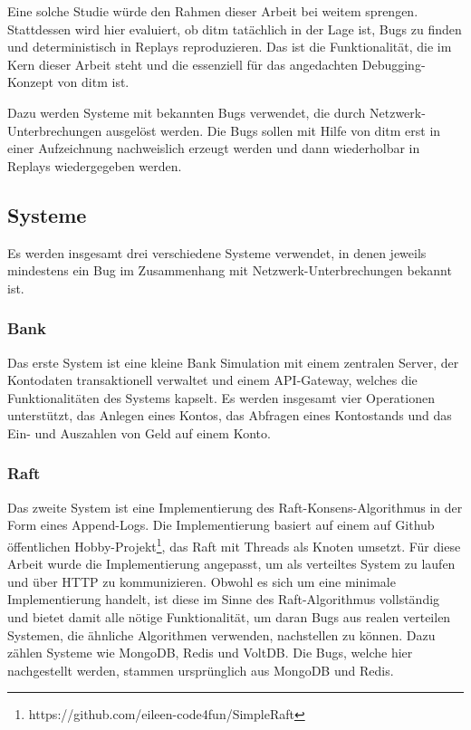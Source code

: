 \documentclass[12pt,a4paper]{report}
\begin{document}
Eine solche Studie würde den Rahmen dieser Arbeit bei weitem sprengen. Stattdessen wird hier evaluiert, ob ditm tatächlich in der
Lage ist, Bugs zu finden und deterministisch in Replays reproduzieren. Das ist die Funktionalität, die im Kern dieser Arbeit steht
und die essenziell für das angedachten Debugging-Konzept von ditm ist.

Dazu werden Systeme mit bekannten Bugs verwendet, die durch Netzwerk-Unterbrechungen ausgelöst werden. Die Bugs sollen mit Hilfe
von ditm erst in einer Aufzeichnung nachweislich erzeugt werden und dann wiederholbar in Replays wiedergegeben werden.

\subsection{Systeme}
Es werden insgesamt drei verschiedene Systeme verwendet, in denen jeweils mindestens ein Bug im Zusammenhang mit
Netzwerk-Unterbrechungen bekannt ist.

\subsubsection{Bank}
Das erste System ist eine kleine Bank Simulation mit einem zentralen Server, der Kontodaten transaktionell verwaltet und einem
API-Gateway, welches die Funktionalitäten des Systems kapselt. Es werden insgesamt vier Operationen unterstützt, das Anlegen eines
Kontos, das Abfragen eines Kontostands und das Ein- und Auszahlen von Geld auf einem Konto.

\subsubsection{Raft}
\label{chap:raft}
Das zweite System ist eine Implementierung des Raft-Konsens-Algorithmus in der Form eines Append-Logs. Die Implementierung basiert
auf einem auf Github öffentlichen Hobby-Projekt\footnote{https://github.com/eileen-code4fun/SimpleRaft}, das Raft mit Threads als
Knoten umsetzt. Für diese Arbeit wurde die Implementierung angepasst, um als verteiltes System zu laufen und über HTTP zu
kommunizieren. Obwohl es sich um eine minimale Implementierung handelt, ist diese im Sinne des Raft-Algorithmus vollständig und
bietet damit alle nötige Funktionalität, um daran Bugs aus realen verteilen Systemen, die ähnliche Algorithmen verwenden,
nachstellen zu können. Dazu zählen Systeme wie MongoDB, Redis und VoltDB. Die Bugs, welche hier nachgestellt werden, stammen
ursprünglich aus MongoDB und Redis.
\end{document}
